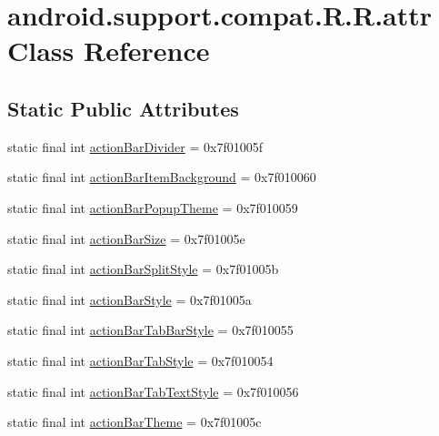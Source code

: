 \hypertarget{classandroid_1_1support_1_1compat_1_1_r_1_1attr}{
\section{android.support.compat.R.R.attr Class Reference}
\label{classandroid_1_1support_1_1compat_1_1_r_1_1attr}
}
\subsection*{Static Public Attributes}
\begin{CompactItemize}
\item 
static final int \hyperlink{classandroid_1_1support_1_1compat_1_1_r_1_1attr_3833129e4ad3188ef3b72a8b44971f9a}{actionBarDivider} = 0x7f01005f
\item 
static final int \hyperlink{classandroid_1_1support_1_1compat_1_1_r_1_1attr_c2de6e88cf678af3f457b2fa0781e0b9}{actionBarItemBackground} = 0x7f010060
\item 
static final int \hyperlink{classandroid_1_1support_1_1compat_1_1_r_1_1attr_48bed46d06f99ac670f95ded412e457e}{actionBarPopupTheme} = 0x7f010059
\item 
static final int \hyperlink{classandroid_1_1support_1_1compat_1_1_r_1_1attr_237324a780420ec18d0667db40e551de}{actionBarSize} = 0x7f01005e
\item 
static final int \hyperlink{classandroid_1_1support_1_1compat_1_1_r_1_1attr_229219d97192673508c5493eb5ee1faa}{actionBarSplitStyle} = 0x7f01005b
\item 
static final int \hyperlink{classandroid_1_1support_1_1compat_1_1_r_1_1attr_0cd78d86e53877b420c936e1eecf1cbe}{actionBarStyle} = 0x7f01005a
\item 
static final int \hyperlink{classandroid_1_1support_1_1compat_1_1_r_1_1attr_6248cf0bc0dc20603b45734452f2659f}{actionBarTabBarStyle} = 0x7f010055
\item 
static final int \hyperlink{classandroid_1_1support_1_1compat_1_1_r_1_1attr_ec00d2c1e26563a4cdae1b355d2ce253}{actionBarTabStyle} = 0x7f010054
\item 
static final int \hyperlink{classandroid_1_1support_1_1compat_1_1_r_1_1attr_78a14f39a7d5aa3f5c67587cbae8f740}{actionBarTabTextStyle} = 0x7f010056
\item 
static final int \hyperlink{classandroid_1_1support_1_1compat_1_1_r_1_1attr_4d3e2837e67c4394fffe8431d7e04dcd}{actionBarTheme} = 0x7f01005c
\item 

\end{CompactItemize}
